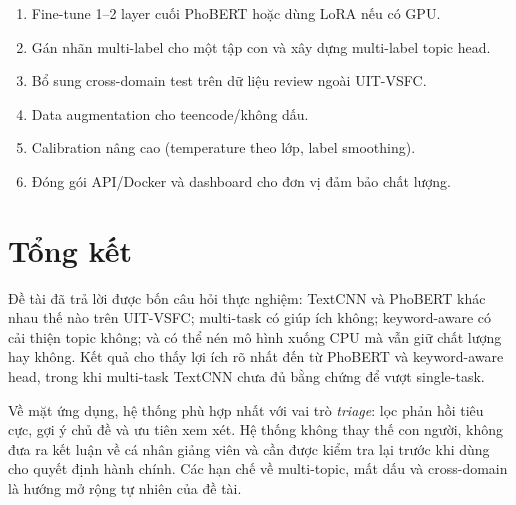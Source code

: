 \documentclass[12pt,a4paper]{report}
\begin{document}
\begin{enumerate}[leftmargin=1.2cm]
  \item Fine-tune 1--2 layer cuối PhoBERT hoặc dùng LoRA nếu có GPU.
  \item Gán nhãn multi-label cho một tập con và xây dựng multi-label topic head.
  \item Bổ sung cross-domain test trên dữ liệu review ngoài UIT-VSFC.
  \item Data augmentation cho teencode/không dấu.
  \item Calibration nâng cao (temperature theo lớp, label smoothing).
  \item Đóng gói API/Docker và dashboard cho đơn vị đảm bảo chất lượng.
\end{enumerate}

\section{Tổng kết}
Đề tài đã trả lời được bốn câu hỏi thực nghiệm: TextCNN và PhoBERT khác nhau thế nào trên UIT-VSFC; multi-task có giúp ích không; keyword-aware có cải thiện topic không; và có thể nén mô hình xuống CPU mà vẫn giữ chất lượng hay không. Kết quả cho thấy lợi ích rõ nhất đến từ PhoBERT và keyword-aware head, trong khi multi-task TextCNN chưa đủ bằng chứng để vượt single-task.

Về mặt ứng dụng, hệ thống phù hợp nhất với vai trò \emph{triage}: lọc phản hồi tiêu cực, gợi ý chủ đề và ưu tiên xem xét. Hệ thống không thay thế con người, không đưa ra kết luận về cá nhân giảng viên và cần được kiểm tra lại trước khi dùng cho quyết định hành chính. Các hạn chế về multi-topic, mất dấu và cross-domain là hướng mở rộng tự nhiên của đề tài.
\end{document}

